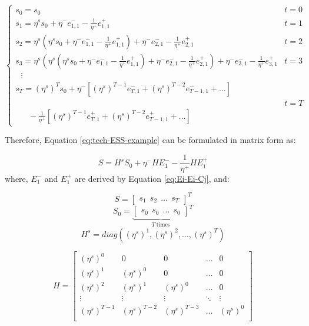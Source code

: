 \begin{equation*}
\begin{cases}
 s_0 = s_0 &  t = 0 \\
s_1 = \eta^s s_0 +  \eta^- e_{1,1}^{-}  - \frac{1}{\eta^+} e_{1,1}^{+} & t = 1\\
s_2 = \eta^s \left(\eta^s s_0 +  \eta^- e_{1,1}^{-}  - \frac{1}{\eta^+} e_{1,1}^{+}\right) + \eta^- e_{2,1}^{-}  - \frac{1}{\eta^+} e_{2,1}^{+} & t = 2 \\
s_3 = \eta^s \left( \eta^s \left(\eta^s s_0 +  \eta^- e_{1,1}^{-}  - \frac{1}{\eta^+} e_{1,1}^{+}\right) + \eta^- e_{2,1}^{-}  - \frac{1}{\eta^+} e_{2,1}^{+}\right) + \eta^- e_{3,1}^{-}  - \frac{1}{\eta^+} e_{3,1}^{+} & t = 3 \\
~~~\vdots \\
s_T = {(\eta^s)}^{T} s_0+ \eta^- \left[ {(\eta^s)}^{T-1}  e_{T,1}^{-} + {(\eta^s)}^{T-2} e_{T-1,1}^{-} + \dots \right] \\
~~& t = T \\
~~~~~~~- \frac{1}{\eta^+} \left[{(\eta^s)}^{T-1}  e_{T,1}^{+} + {(\eta^s)}^{T-2}  e_{T-1,1}^{+} + \dots \right]  
\end{cases}
\end{equation*}

Therefore, Equation \eqref{eq:tech-ESS-example} can be formulated in matrix form as:

\begin{equation*}
S = H^s S_0 + \eta^-  H E^-_1 - \frac{1}{\eta^+} H E^+_1
\end{equation*}
where, $E^-_1$ and $E^+_1$ are derived by Equation \eqref{eq:Ei-Ei-Cj}, and:

\begin{equation*}
S = \begin{bmatrix}
s_1~~s_2~~\dots~~s_T
\end{bmatrix}^T
\end{equation*}
\begin{equation*}
S_0 = {\underbrace{\begin{bmatrix}
	s_0~~s_0~~ \dots~~s_0
	\end{bmatrix}}_{T~\text{times}}}^T
\end{equation*}
\begin{equation*}
H^s = diag({(\eta^s)}^1 , {(\eta^s)}^2, \dots,{(\eta^s)}^T)
\end{equation*}

\[
H
=
\begin{bmatrix}
{(\eta^s)}^0 & 0 & 0 &  \dots & 0 \\
{(\eta^s)}^1 & {(\eta^s)}^0 & 0 &  \dots & 0 \\
{(\eta^s)}^2 & {(\eta^s)}^1 & {(\eta^s)}^0 &  \dots & 0 \\
\vdots & \vdots & \vdots &  \ddots & \vdots \\
{(\eta^s)}^{T-1} & {(\eta^s)}^{T-2} & {(\eta^s)}^{T-3} & \dots & {(\eta^s)}^0 \\
\end{bmatrix}
\]
\newline

